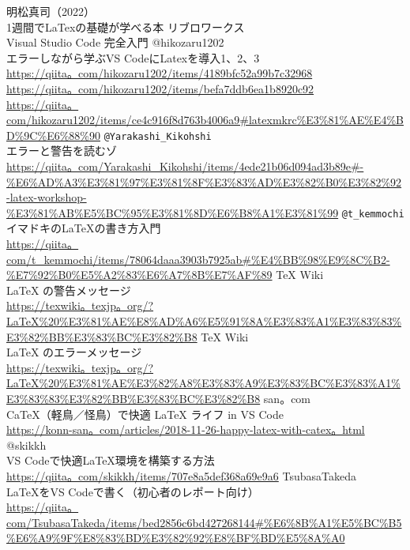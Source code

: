 \documentclass{ltjsarticle}
\begin{document}
\begin{thebibliography}{999}
  明松真司（2022）\\
  1週間でLaTexの基礎が学べる本
  リブロワークス\\
  Visual Studio Code 完全入門
  @hikozaru1202\\
  エラーしながら学ぶVS CodeにLatexを導入1、2、3\\
  \url{https://qiita。com/hikozaru1202/items/4189bfc52a99b7c32968}\\
  \url{https://qiita。com/hikozaru1202/items/befa7ddb6ea1b8920c92}\\
  \url{https://qiita。com/hikozaru1202/items/ce4c916f8d763b4006a9#latexmkrc%E3%81%AE%E4%BD%9C%E6%88%90}
  \verb|@Yarakashi_Kikohshi|\\
  エラーと警告を読むゾ\\
  \url{https://qiita。com/Yarakashi_Kikohshi/items/4ede21b06d094ad3b89e#-%E6%AD%A3%E3%81%97%E3%81%8F%E3%83%AD%E3%82%B0%E3%82%92-latex-workshop-%E3%81%AB%E5%BC%95%E3%81%8D%E6%B8%A1%E3%81%99}
  \verb|@t_kemmochi|\\
  イマドキのLaTeXの書き方入門\\
  \url{https://qiita。com/t_kemmochi/items/78064daaa3903b7925ab#%E4%BB%98%E9%8C%B2-%E7%92%B0%E5%A2%83%E6%A7%8B%E7%AF%89}
  TeX Wiki\\
  LaTeX の警告メッセージ\\
  \url{https://texwiki。texjp。org/?LaTeX%20%E3%81%AE%E8%AD%A6%E5%91%8A%E3%83%A1%E3%83%83%E3%82%BB%E3%83%BC%E3%82%B8}
  TeX Wiki\\
  LaTeX のエラーメッセージ\\
  \url{https://texwiki。texjp。org/?LaTeX%20%E3%81%AE%E3%82%A8%E3%83%A9%E3%83%BC%E3%83%A1%E3%83%83%E3%82%BB%E3%83%BC%E3%82%B8}
  san。com\\
  CaTeX（軽鳥／怪鳥）で快適 LaTeX ライフ in VS Code\\
  \url{https://konn-san。com/articles/2018-11-26-happy-latex-with-catex。html}
  @skikkh\\
  VS Codeで快適LaTeX環境を構築する方法\\
  \url{https://qiita。com/skikkh/items/707e8a5def368a69e9a6}
  TsubasaTakeda\\
  LaTeXをVS Codeで書く（初心者のレポート向け）\\
  \url{https://qiita。com/TsubasaTakeda/items/bed2856c6bd427268144#%E6%8B%A1%E5%BC%B5%E6%A9%9F%E8%83%BD%E3%82%92%E8%BF%BD%E5%8A%A0}

\end{thebibliography}
\end{document}
